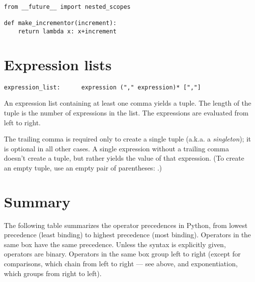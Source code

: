 \begin{verbatim}
from __future__ import nested_scopes

def make_incrementor(increment):
    return lambda x: x+increment
\end{verbatim}


\section{Expression lists\label{exprlists}}

\begin{verbatim}
expression_list:      expression ("," expression)* [","]
\end{verbatim}

An expression list containing at least one comma yields a
tuple.  The length of the tuple is the number of expressions in the
list.  The expressions are evaluated from left to right.

The trailing comma is required only to create a single tuple (a.k.a. a
\emph{singleton}); it is optional in all other cases.  A single
expression without a trailing comma doesn't create a
tuple, but rather yields the value of that expression.
(To create an empty tuple, use an empty pair of parentheses:
\code{()}.)


\section{Summary\label{summary}}

The following table summarizes the operator
precedences in Python, from lowest
precedence (least binding) to highest precedence (most binding).
Operators in the same box have the same precedence.  Unless the syntax
is explicitly given, operators are binary.  Operators in the same box
group left to right (except for comparisons, which chain from left to
right --- see above, and exponentiation, which groups from right to
left).

